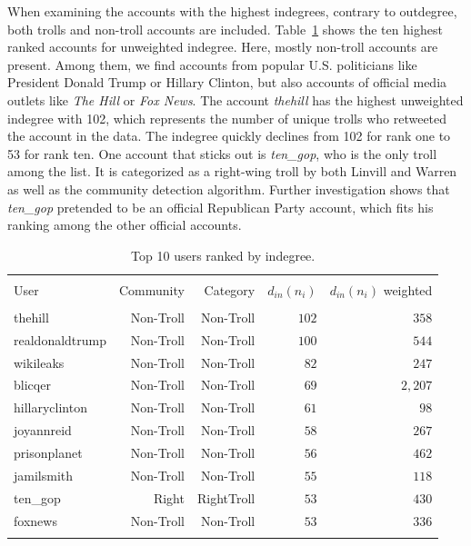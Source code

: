 \documentclass[12pt, titlepage=true, toc=bib]{scrartcl}
\begin{document}
When examining the accounts with the highest indegrees, contrary to outdegree, both trolls and non-troll accounts are included. Table~\ref{tab:in} shows the ten highest ranked accounts for unweighted indegree. Here, mostly non-troll accounts are present. Among them, we find  accounts from popular U.S. politicians like President Donald Trump or Hillary Clinton, but also accounts of official media outlets like \textit{The Hill} or \textit{Fox News}. The account \textit{thehill} has the highest unweighted indegree with 102, which represents the number of unique trolls who retweeted the account in the data. The indegree quickly declines from 102 for rank one to 53 for rank ten. One account that sticks out is \textit{ten\_gop}, who is the only troll among the list. It is categorized as a right-wing troll by both Linvill and Warren \cite*{linvill_troll_2018} as well as the community detection algorithm. Further investigation shows that \textit{ten\_gop} pretended to be an official Republican Party account, which fits his ranking among the other official accounts. %

\begin{table}[!ht] \centering 
  \begin{tabular*}{.95\linewidth}{@{\extracolsep{\fill}} lrrrr} 
\\[-1.8ex]\hline 
\hline \\[-1.8ex] 
User & Community & Category & \( d_{in}(n_{i}) \) & \( d_{in}(n_{i}) \) weighted \\ 
\hline \\[-1.8ex] 
thehill & Non-Troll & Non-Troll & $102$ & $358$ \\ 
realdonaldtrump & Non-Troll & Non-Troll & $100$ & $544$ \\ 
wikileaks & Non-Troll & Non-Troll & $82$ & $247$ \\ 
blicqer & Non-Troll & Non-Troll & $69$ & $2,207$ \\ 
hillaryclinton & Non-Troll & Non-Troll & $61$ & $98$ \\ 
joyannreid & Non-Troll & Non-Troll & $58$ & $267$ \\ 
prisonplanet & Non-Troll & Non-Troll & $56$ & $462$ \\ 
jamilsmith & Non-Troll & Non-Troll & $55$ & $118$ \\ 
ten\_gop & Right & RightTroll & $53$ & $430$ \\ 
foxnews & Non-Troll & Non-Troll & $53$ & $336$ \\ 
\hline \\[-1.8ex] 
\end{tabular*} 
\caption[Indegree]{Top 10 users ranked by indegree.} 
  \label{tab:in} 
\end{table} 
\end{document}

